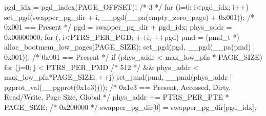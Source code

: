 \documentclass[varwidth=34em,crop]{standalone}
\begin{document}
\begin{ccode}
pgd_idx = pgd_index(PAGE_OFFSET); /* 3 */
for (i=0; i<pgd_idx; i++)
  set_pgd(swapper_pg_dir + i, __pgd(__pa(empty_zero_page) + 0x001));
  /* 0x001 == Present */
pgd = swapper_pg_dir + pgd_idx;
phys_addr = 0x00000000;
for (; i<PTRS_PER_PGD; ++i, ++pgd) {
  pmd = (pmd_t *) alloc_bootmem_low_pages(PAGE_SIZE);
  set_pgd(pgd, __pgd(__pa(pmd) | 0x001)); /* 0x001 == Present */
  if (phys_addr < max_low_pfn * PAGE_SIZE)
    for (j=0; j < PTRS_PER_PMD /* 512 */
      && phys_addr < max_low_pfn*PAGE_SIZE; ++j) {
      set_pmd(pmd, __pmd(phys_addr | pgprot_val(__pgprot(0x1e3))));
      /* 0x1e3 == Present, Accessed, Dirty, Read/Write,
         Page Size, Global */
      phys_addr += PTRS_PER_PTE * PAGE_SIZE; /* 0x200000 */
    }
 }
swapper_pg_dir[0] = swapper_pg_dir[pgd_idx];  
\end{ccode}
\end{document}
